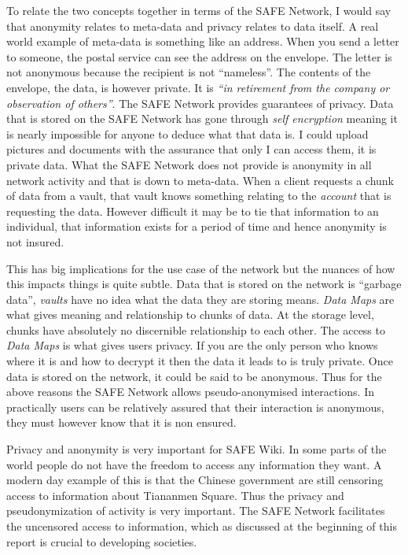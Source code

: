 To relate the two concepts together in terms of the SAFE Network, I would say that anonymity relates to meta-data and privacy relates to data itself. A real world example of meta-data is something like an address. When you send a letter to someone, the postal service can see the address on the envelope. The letter is not anonymous because the recipient is not ``nameless''. The contents of the envelope, the data, is however private. It is \textit{``in retirement from the company or observation of others''}. The SAFE Network provides guarantees of privacy. Data that is stored on the SAFE Network has gone through \textit{self encryption} meaning it is nearly impossible for anyone to deduce what that data is. I could upload pictures and documents with the assurance that only I can access them, it is private data. What the SAFE Network does not provide is anonymity in all network activity and that is down to meta-data. When a client requests a chunk of data from a vault, that vault knows something relating to the \textit{account} that is requesting the data. However difficult it may be to tie that information to an individual, that information exists for a period of time and hence anonymity is not insured.

This has big implications for the use case of the network but the nuances of how this impacts things is quite subtle. Data that is stored on the network is ``garbage data'', \textit{vaults} have no idea what the data they are storing means. \textit{Data Maps} are what gives meaning and relationship to chunks of data. At the storage level, chunks have absolutely no discernible relationship to each other. The access to \textit{Data Maps} is what gives users privacy. If you are the only person who knows where it is and how to decrypt it then the data it leads to is truly private. Once data is stored on the network, it could be said to be anonymous. Thus for the above reasons the SAFE Network allows pseudo-anonymised interactions. In practically users can be relatively assured that their interaction is anonymous, they must however know that it is non ensured.

Privacy and anonymity is very important for SAFE Wiki. In some parts of the world people do not have the freedom to access any information they want. A modern day example of this is that the Chinese government are still censoring access to information about Tiananmen Square\cite{tiananmen-square}. Thus the privacy and pseudonymization of activity is very important. The SAFE Network facilitates the uncensored access to information, which as discussed at the beginning of this report is crucial to developing societies.

